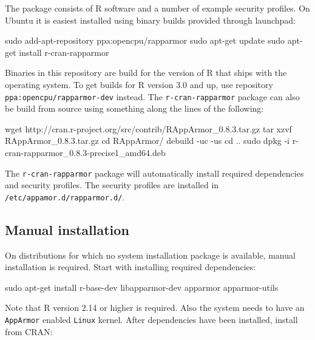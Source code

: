 \documentclass{jss}
\newcommand{\R}{\textsf{R}\xspace}
\newcommand{\AppArmor}{\texttt{AppArmor}\xspace}
\newcommand{\RAppArmor}{\pkg{RAppArmor}\xspace}
\newcommand{\Linux}{\texttt{Linux}\xspace}
\begin{document}
The \RAppArmor package consists of \R software and a number of example security
profiles. On Ubuntu it is easiest installed using binary builds provided
through launchpad:

\begin{CodeChunk}
\begin{CodeInput}
sudo add-apt-repository ppa:opencpu/rapparmor
sudo apt-get update
sudo apt-get install r-cran-rapparmor
\end{CodeInput}
\end{CodeChunk}

Binaries in this repository are build for the version of \R that ships with the
operating system. To get builds for \R version 3.0 and up, use repository
\texttt{ppa:opencpu/rapparmor-dev} instead. The \texttt{r-cran-rapparmor}
package can also be build from source using something along the lines of the
following:

\begin{CodeChunk}
\begin{CodeInput}
wget http://cran.r-project.org/src/contrib/RAppArmor_0.8.3.tar.gz
tar xzvf RAppArmor_0.8.3.tar.gz
cd RAppArmor/
debuild -uc -us
cd ..
sudo dpkg -i r-cran-rapparmor_0.8.3-precise1_amd64.deb
\end{CodeInput}
\end{CodeChunk}

The \texttt{r-cran-rapparmor} package will automatically install required
dependencies and security profiles. The security profiles are installed in
\texttt{/etc/appamor.d/rapparmor.d/}.

\subsection{Manual installation}

On distributions for which no system installation package is available, manual
installation is required. Start with installing required dependencies:

\begin{CodeChunk}
\begin{CodeInput}
sudo apt-get install r-base-dev libapparmor-dev apparmor apparmor-utils
\end{CodeInput}
\end{CodeChunk}

Note that \R version 2.14 or higher is required. Also the system needs to have
an \AppArmor enabled \Linux kernel. After dependencies have been installed,
install \RAppArmor from CRAN:
\end{document}
